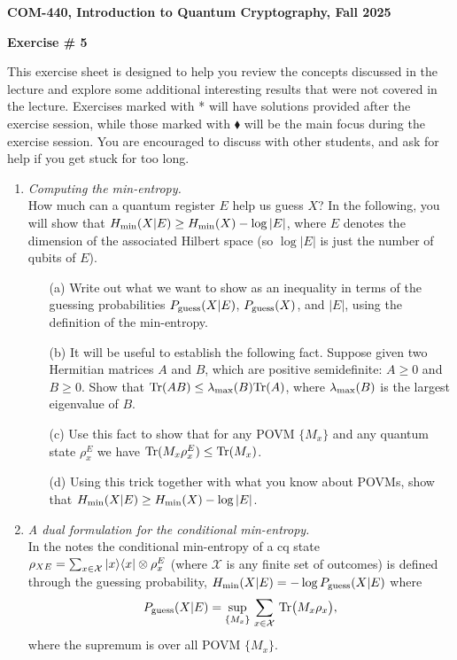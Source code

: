 \documentclass[12pt]{article}
\newcommand{\header}[1]{\begin{center} {\large\bf #1} \end{center}}
\begin{document}
\header{COM-440, Introduction to Quantum Cryptography, Fall 2025}
\header{\bf Exercise \# 5}

This exercise sheet is designed to help you review the concepts discussed in the lecture and explore some additional interesting results that were not covered in the lecture. Exercises marked with * will have solutions provided after the exercise session, while those marked with $\blacklozenge$ will be the main focus during the exercise session. You are encouraged to discuss with other students, and ask for help if you get stuck for too long.

\begin{enumerate}

\item {\em Computing the min-entropy.}\\
How much can a quantum register $E$ help us guess $X$? In the following, you will show that $H_{\rm min}(X|E) \geq H_{\rm min}(X) - \log |E|$, where $E$ denotes the dimension of the associated Hilbert space (so $\log |E|$ is just the number of qubits of $E$).
\begin{enumerate}
\item[(a)] Write out what we want to show as an inequality in terms of the guessing probabilities $P_{\rm guess}(X|E)$, $P_{\rm guess}(X)$, and $|E|$, using the definition of the min-entropy.
\item[(b)] It will be useful to establish the following fact. Suppose given two Hermitian matrices $A$ and $B$, which are positive semidefinite: $A \geq 0$ and $B \geq 0$. Show that $\mathrm{Tr}(AB) \leq \lambda_{\rm max}(B) \mathrm{Tr}(A)$, where $\lambda_{\rm max}(B)$ is the largest eigenvalue of $B$.
\item[(c)] Use this fact to show that for any POVM $\{M_x\}$ and any quantum state $\rho^E_x$ we have $\mathrm{Tr}(M_x \rho^E_x) \leq \mathrm{Tr}(M_x)$. 
\item[(d)] Using this trick together with what you know about POVMs, show that $H_{\rm min}(X|E) \geq H_{\rm min}(X) - \log |E|$. 
\end{enumerate}


\item {\em A dual formulation for the conditional min-entropy.}\\
In the notes the conditional min-entropy of a cq state $\rho_{XE}  = \sum_{x\in\mathcal{X}} \ket{x}\!\bra{x}\otimes \rho_x^E$ (where $\mathcal{X}$ is any finite set of outcomes) is defined through the guessing probability, $H_{\rm min}(X|E) = -\log P_{\rm guess}(X|E)$ where 
\begin{equation}\label{eq:pguess}
 P_{\rm guess}(X|E) = \sup_{\{M_x\}}\,\sum_{x\in\mathcal{X}} \,\mathrm{Tr}\big(M_x\rho_x\big), 
\end{equation}
where the supremum is over all POVM $\{M_x\}$.


\end{enumerate}
\end{document}
